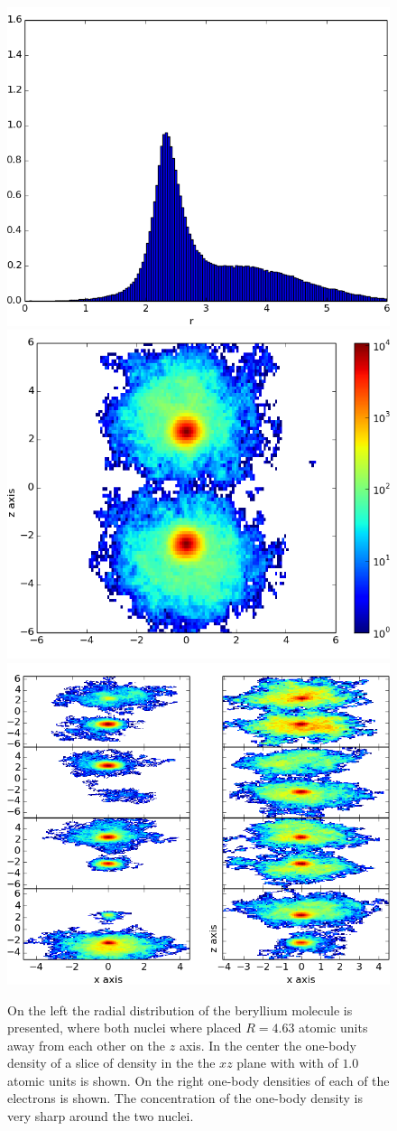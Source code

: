 			\begin{figure}[H]
				\centering \includegraphics[width=0.32\linewidth]{content/Results/figures/ChargeDensityBerylliumTwo}
				\centering \includegraphics[width=0.32\linewidth]{content/Results/figures/OneBodyDensityBerylliumTwo}
				\centering \includegraphics[width=0.32\linewidth]{content/Results/figures/OneBodyDensityElectronsBerylliumTwo}
				\protect\caption{On the left the radial distribution of the beryllium molecule is presented, where both nuclei where placed \(R = 4.63\) atomic units away from each other on the \(z\) axis. In the center the one-body density of a slice of density in the the \(xz\) plane with with of \(1.0\) atomic units is shown. On the right one-body densities of each of the electrons is shown. The concentration of the one-body density is very sharp around the two nuclei.}
				\label{fig:oneBodyDensityBerylliumTwo}
			\end{figure}

